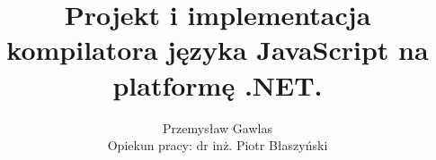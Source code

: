 \title
 {Projekt i implementacja kompilatora języka JavaScript na platformę .NET.}
\author[Przemysław Gawlas]
	{Przemysław Gawlas\\[3mm]Opiekun pracy: dr inż. Piotr Błaszyński}


\date{}

\begin{frame}
	\titlepage
\end{frame}
